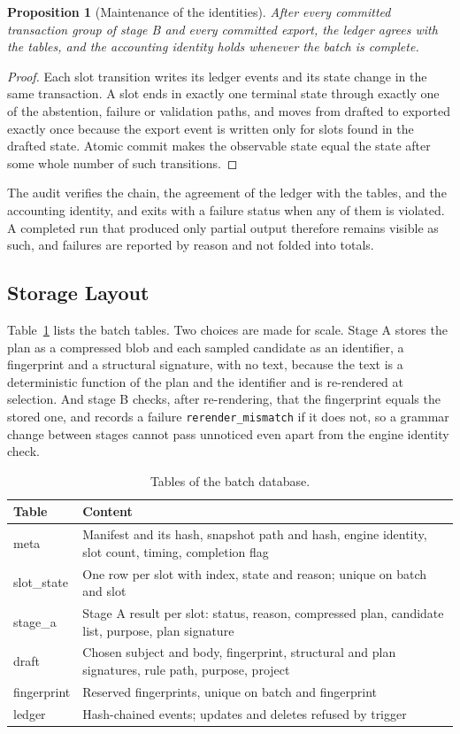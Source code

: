 \documentclass[11pt]{article}
\newtheorem{proposition}[theorem]{Proposition}
\theoremstyle{definition}
\theoremstyle{remark}
\newcommand{\code}[1]{\texttt{#1}}
\begin{document}
\begin{proposition}[Maintenance of the identities]\label{prop:account}
After every committed transaction group of stage B and every committed export, the ledger agrees with the tables, and the accounting identity holds whenever the batch is complete.
\end{proposition}
\begin{proof}
Each slot transition writes its ledger events and its state change in the same transaction. A slot ends in exactly one terminal state through exactly one of the abstention, failure or validation paths, and moves from drafted to exported exactly once because the export event is written only for slots found in the drafted state. Atomic commit \cite{grayreuter1993} makes the observable state equal the state after some whole number of such transitions.
\end{proof}

The audit verifies the chain, the agreement of the ledger with the tables, and the accounting identity, and exits with a failure status when any of them is violated. A completed run that produced only partial output therefore remains visible as such, and failures are reported by reason and not folded into totals.

\subsection{Storage Layout}

Table~\ref{tab:storage} lists the batch tables. Two choices are made for scale. Stage A stores the plan as a compressed blob and each sampled candidate as an identifier, a fingerprint and a structural signature, with no text, because the text is a deterministic function of the plan and the identifier and is re-rendered at selection. And stage B checks, after re-rendering, that the fingerprint equals the stored one, and records a failure \code{rerender\_mismatch} if it does not, so a grammar change between stages cannot pass unnoticed even apart from the engine identity check.

\begin{table}[H]
\centering
\caption{Tables of the batch database.}\label{tab:storage}
\begin{tabular}{p{3cm}p{9.5cm}}
\toprule
Table & Content\\
\midrule
meta & Manifest and its hash, snapshot path and hash, engine identity, slot count, timing, completion flag\\
slot\_state & One row per slot with index, state and reason; unique on batch and slot\\
stage\_a & Stage A result per slot: status, reason, compressed plan, candidate list, purpose, plan signature\\
draft & Chosen subject and body, fingerprint, structural and plan signatures, rule path, purpose, project\\
fingerprint & Reserved fingerprints, unique on batch and fingerprint\\
ledger & Hash-chained events; updates and deletes refused by trigger\\
\bottomrule
\end{tabular}
\end{table}
\end{document}
